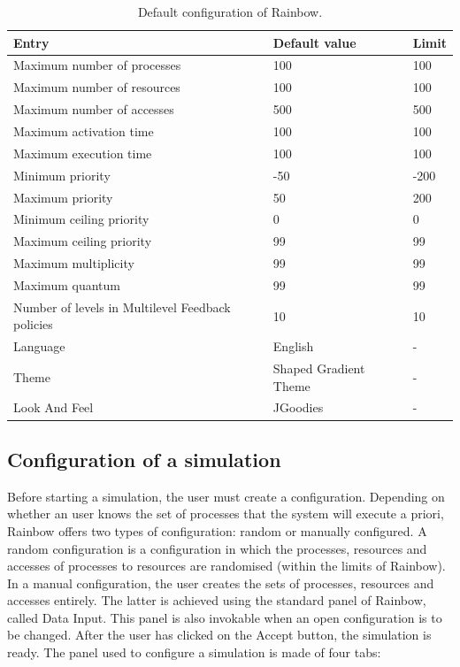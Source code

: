 \documentclass[10pt,a4paper,twoside,titlepage]{article}
\begin{document}
\begin{center}
\begin{table}[tb]
    \begin{tabular}{ | l | l | l |}
    \hline
    \textbf{Entry} & \textbf{Default value} & \textbf{Limit} \\ \hline
    Maximum number of processes & 100 & 100 \\ \hline
    Maximum number of resources & 100 & 100 \\ \hline
    Maximum number of accesses & 500 & 500 \\ \hline
    Maximum activation time & 100 & 100 \\ \hline
    Maximum execution time & 100 & 100 \\ \hline
    Minimum priority & -50 & -200 \\ \hline        
    Maximum priority & 50 & 200 \\ \hline
    Minimum ceiling priority & 0 & 0 \\ \hline        
    Maximum ceiling priority & 99 & 99 \\ \hline    
    Maximum multiplicity & 99 & 99 \\ \hline
    Maximum quantum & 99 & 99 \\ \hline
    Number of levels in Multilevel Feedback policies & 10 & 10 \\ \hline        
    Language & English & - \\ \hline
    Theme & Shaped Gradient Theme & - \\ \hline
    Look And Feel & JGoodies & - \\
    \hline
    \end{tabular}
    \caption[Default configuration of Rainbow]{Default configuration of Rainbow.}    
    \label{tab:default_config}    
\end{table}    
\end{center}




\subsection{Configuration of a simulation}
\label{subsec:configuration_of_a_simulation}
Before starting a simulation, the user must create a configuration. 
Depending on whether an user knows the set of processes that the system will execute a priori, Rainbow offers two types of configuration: random or manually configured. A random configuration is a configuration in which the processes, resources and accesses of processes to resources are randomised (within the limits of Rainbow). In a manual configuration, the user creates the sets of processes, resources and accesses entirely. The latter is achieved using the standard panel of Rainbow, called Data Input. This panel is also invokable when an open configuration is to be changed. After the user has clicked on the Accept button, the simulation is ready.
The panel used to configure a simulation is made of four tabs:
\end{document}

